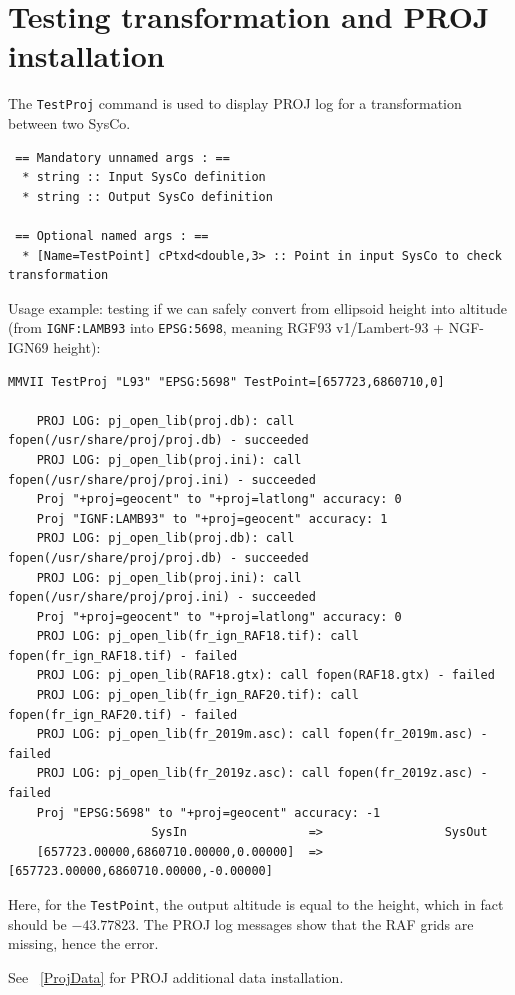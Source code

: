 \section{Testing transformation and PROJ installation}
The \texttt{TestProj} command is used to display PROJ log for a transformation between two SysCo.

\begin{verbatim}
 == Mandatory unnamed args : ==
  * string :: Input SysCo definition
  * string :: Output SysCo definition

 == Optional named args : ==
  * [Name=TestPoint] cPtxd<double,3> :: Point in input SysCo to check transformation
\end{verbatim}

Usage example: testing if we can safely convert from ellipsoid height into altitude
(from \texttt{IGNF:LAMB93} into \texttt{EPSG:5698}, meaning RGF93 v1/Lambert-93 + NGF-IGN69 height):

\begin{verbatim}
MMVII TestProj "L93" "EPSG:5698" TestPoint=[657723,6860710,0]

    PROJ LOG: pj_open_lib(proj.db): call fopen(/usr/share/proj/proj.db) - succeeded
    PROJ LOG: pj_open_lib(proj.ini): call fopen(/usr/share/proj/proj.ini) - succeeded
    Proj "+proj=geocent" to "+proj=latlong" accuracy: 0
    Proj "IGNF:LAMB93" to "+proj=geocent" accuracy: 1
    PROJ LOG: pj_open_lib(proj.db): call fopen(/usr/share/proj/proj.db) - succeeded
    PROJ LOG: pj_open_lib(proj.ini): call fopen(/usr/share/proj/proj.ini) - succeeded
    Proj "+proj=geocent" to "+proj=latlong" accuracy: 0
    PROJ LOG: pj_open_lib(fr_ign_RAF18.tif): call fopen(fr_ign_RAF18.tif) - failed
    PROJ LOG: pj_open_lib(RAF18.gtx): call fopen(RAF18.gtx) - failed
    PROJ LOG: pj_open_lib(fr_ign_RAF20.tif): call fopen(fr_ign_RAF20.tif) - failed
    PROJ LOG: pj_open_lib(fr_2019m.asc): call fopen(fr_2019m.asc) - failed
    PROJ LOG: pj_open_lib(fr_2019z.asc): call fopen(fr_2019z.asc) - failed
    Proj "EPSG:5698" to "+proj=geocent" accuracy: -1
                    SysIn                 =>                 SysOut                
    [657723.00000,6860710.00000,0.00000]  =>  [657723.00000,6860710.00000,-0.00000]
\end{verbatim}

Here, for the \texttt{TestPoint}, the output altitude is equal to the height, which in fact should be $-43.77823$.
The PROJ log messages show that the RAF grids are missing, hence the error.

See ~\ref{ProjData} for PROJ additional data installation.


